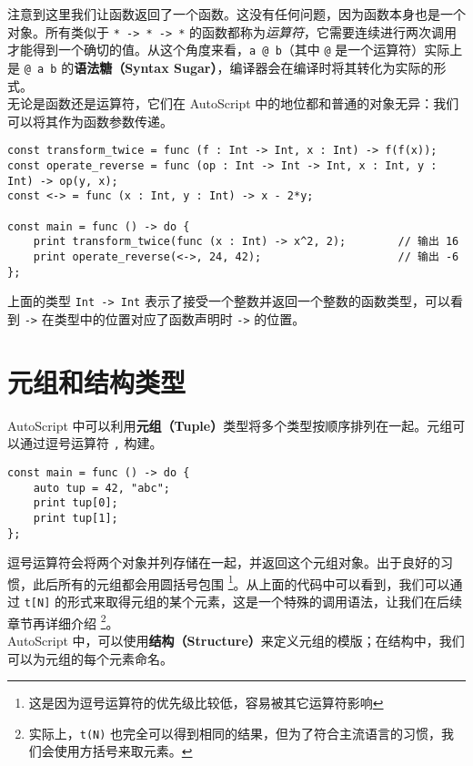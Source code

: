 注意到这里我们让函数返回了一个函数。这没有任何问题，因为函数本身也是一个对象。所有类似于 \lstinline!* -> * -> *! 的函数都称为\emph{运算符}，它需要连续进行两次调用才能得到一个确切的值。从这个角度来看，\lstinline!a @ b!（其中 \lstinline!@! 是一个运算符）实际上是 \lstinline!@ a b! 的\textbf{语法糖（Syntax Sugar）}，编译器会在编译时将其转化为实际的形式。  \\

无论是函数还是运算符，它们在 AutoScript 中的地位都和普通的对象无异：我们可以将其作为函数参数传递。

\begin{lstlisting}
const transform_twice = func (f : Int -> Int, x : Int) -> f(f(x));
const operate_reverse = func (op : Int -> Int -> Int, x : Int, y : Int) -> op(y, x);
const <-> = func (x : Int, y : Int) -> x - 2*y;

const main = func () -> do {
	print transform_twice(func (x : Int) -> x^2, 2);		// 输出 16
	print operate_reverse(<->, 24, 42);						// 输出 -6
};
\end{lstlisting}

上面的类型 \lstinline!Int -> Int! 表示了接受一个整数并返回一个整数的函数类型，可以看到 \lstinline!->! 在类型中的位置对应了函数声明时 \lstinline!->! 的位置。


\section{元组和结构类型}

AutoScript 中可以利用\textbf{元组（Tuple）}类型将多个类型按顺序排列在一起。元组可以通过逗号运算符 \lstinline!,! 构建。

\begin{lstlisting}
const main = func () -> do {
    auto tup = 42, "abc";
    print tup[0];
    print tup[1];
};
\end{lstlisting}

逗号运算符会将两个对象并列存储在一起，并返回这个元组对象。出于良好的习惯，此后所有的元组都会用圆括号包围 \footnote{这是因为逗号运算符的优先级比较低，容易被其它运算符影响}。从上面的代码中可以看到，我们可以通过 \lstinline!t[N]! 的形式来取得元组的某个元素，这是一个特殊的调用语法，让我们在后续章节再详细介绍 \footnote{实际上，\lstinline!t(N)! 也完全可以得到相同的结果，但为了符合主流语言的习惯，我们会使用方括号来取元素。}。 \\

AutoScript 中，可以使用\textbf{结构（Structure）}来定义元组的模版；在结构中，我们可以为元组的每个元素命名。


